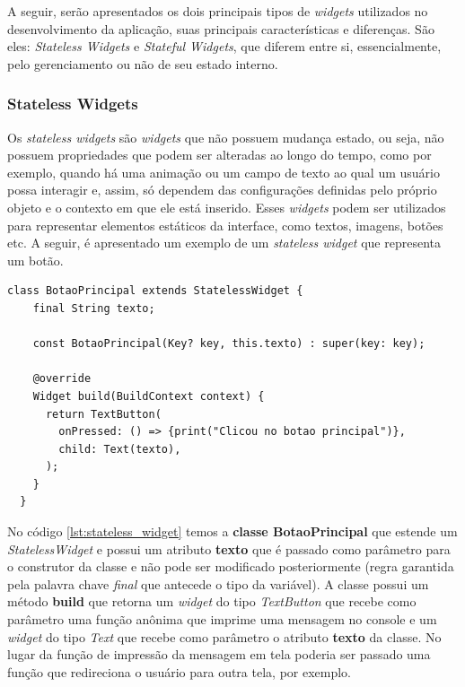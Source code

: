 A seguir, serão apresentados os dois principais tipos de \textit{widgets} utilizados no desenvolvimento da aplicação, suas principais características e diferenças. São eles: \textit{Stateless Widgets} e \textit{Stateful Widgets}, que diferem entre si, essencialmente, pelo gerenciamento ou não de seu estado interno. %

\subsubsection{Stateless Widgets}
Os \textit{stateless widgets} são \textit{widgets} que não possuem mudança estado, ou seja, não possuem propriedades que podem ser alteradas ao longo do tempo, como por exemplo, quando há uma animação ou um campo de texto ao qual um usuário possa interagir e, assim, só dependem das configurações definidas pelo próprio objeto e o contexto em que ele está inserido. Esses \textit{widgets} podem ser utilizados para representar elementos estáticos da interface, como textos, imagens, botões etc. A seguir, é apresentado um exemplo de um \textit{stateless widget} que representa um botão.

\begin{lstlisting}[caption={Exemplo de um \textit{stateless widget} que representa um botão.}, label={lst:stateless_widget}]
  class BotaoPrincipal extends StatelessWidget {
    final String texto;
  
    const BotaoPrincipal(Key? key, this.texto) : super(key: key);
  
    @override
    Widget build(BuildContext context) {
      return TextButton(
        onPressed: () => {print("Clicou no botao principal")},
        child: Text(texto),
      );
    }
  }
\end{lstlisting}

No código \ref{lst:stateless_widget} temos a \textbf{classe BotaoPrincipal} que estende um \textit{StatelessWidget} e possui um atributo \textbf{texto} que é passado como parâmetro para o construtor da classe e não pode ser modificado posteriormente (regra garantida pela palavra chave \textit{final} que antecede o tipo da variável). A classe possui um método \textbf{build} que retorna um \textit{widget} do tipo \textit{TextButton} que recebe como parâmetro uma função anônima que imprime uma mensagem no console e um \textit{widget} do tipo \textit{Text} que recebe como parâmetro o atributo \textbf{texto} da classe. No lugar da função de impressão da mensagem em tela poderia ser passado uma função que redireciona o usuário para outra tela, por exemplo.



